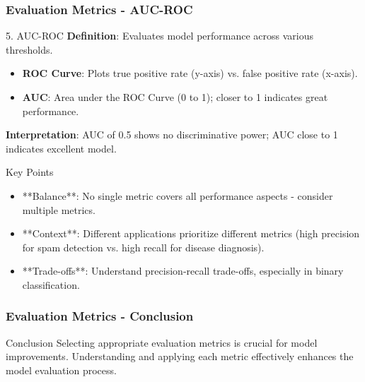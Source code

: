 \documentclass{beamer}
\begin{document}
\begin{frame}[fragile]
    \frametitle{Evaluation Metrics - AUC-ROC}
    \begin{block}{5. AUC-ROC}
        \textbf{Definition}: Evaluates model performance across various thresholds.
        
        \begin{itemize}
            \item \textbf{ROC Curve}: Plots true positive rate (y-axis) vs. false positive rate (x-axis).
            \item \textbf{AUC}: Area under the ROC Curve (0 to 1); closer to 1 indicates great performance.
        \end{itemize}
        \textbf{Interpretation}: AUC of 0.5 shows no discriminative power; AUC close to 1 indicates excellent model.
    \end{block}
    
    \begin{block}{Key Points}
        \begin{itemize}
            \item **Balance**: No single metric covers all performance aspects - consider multiple metrics.
            \item **Context**: Different applications prioritize different metrics (high precision for spam detection vs. high recall for disease diagnosis).
            \item **Trade-offs**: Understand precision-recall trade-offs, especially in binary classification.
        \end{itemize}
    \end{block}
\end{frame}

\begin{frame}[fragile]
    \frametitle{Evaluation Metrics - Conclusion}
    \begin{block}{Conclusion}
        Selecting appropriate evaluation metrics is crucial for model improvements. Understanding and applying each metric effectively enhances the model evaluation process.
    \end{block}
\end{frame}
\end{document}
